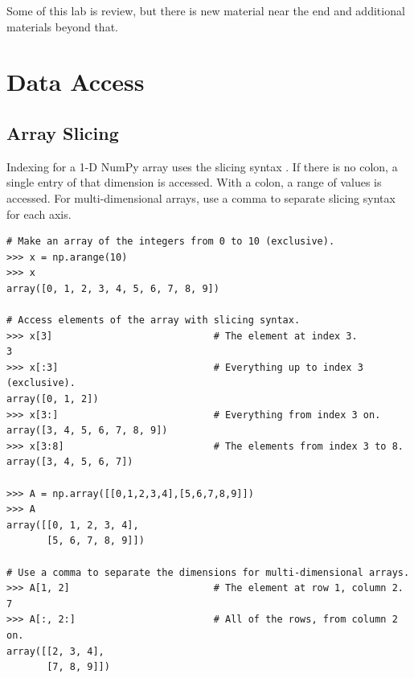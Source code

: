 \label{lab:AdvancedNumpy}

\begin{info}
Some of this lab is review, but there is new material near the end and additional materials beyond that.
\end{info}

\section*{Data Access} %

\subsection*{Array Slicing} %

Indexing for a 1-D NumPy array uses the slicing syntax .
If there is no colon, a single entry of that dimension is accessed.
With a colon, a range of values is accessed.
For multi-dimensional arrays, use a comma to separate slicing syntax for each axis.

\begin{lstlisting}
# Make an array of the integers from 0 to 10 (exclusive).
>>> x = np.arange(10)
>>> x
array([0, 1, 2, 3, 4, 5, 6, 7, 8, 9])

# Access elements of the array with slicing syntax.
>>> x[3]                            # The element at index 3.
3
>>> x[:3]                           # Everything up to index 3 (exclusive).
array([0, 1, 2])
>>> x[3:]                           # Everything from index 3 on.
array([3, 4, 5, 6, 7, 8, 9])
>>> x[3:8]                          # The elements from index 3 to 8.
array([3, 4, 5, 6, 7])

>>> A = np.array([[0,1,2,3,4],[5,6,7,8,9]])
>>> A
array([[0, 1, 2, 3, 4],
       [5, 6, 7, 8, 9]])

# Use a comma to separate the dimensions for multi-dimensional arrays.
>>> A[1, 2]                         # The element at row 1, column 2.
7
>>> A[:, 2:]                        # All of the rows, from column 2 on.
array([[2, 3, 4],
       [7, 8, 9]])
\end{lstlisting}

